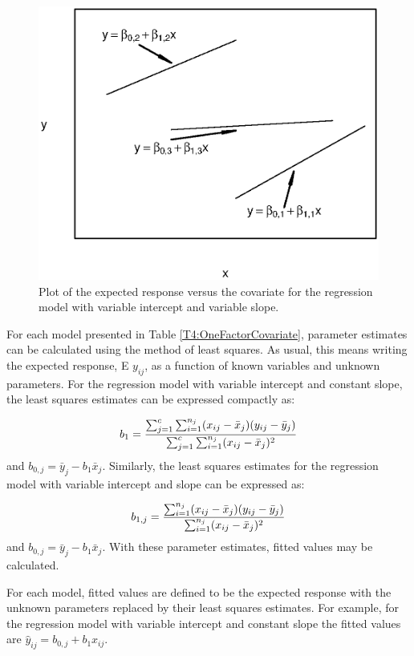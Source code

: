 \begin{figure}[htp]
  \begin{center}
    \includegraphics[width=.6\textwidth]{Chapter4/F4TheoryVarIntVarSlope.eps}
    \caption{\label{F4:TheoryVarIntVarSlope} \small  Plot of the expected response versus the covariate for the regression model
with variable intercept and variable slope.}
  \end{center}
\end{figure}

For each model presented in Table \ref{T4:OneFactorCovariate},
parameter estimates can be calculated using the method of least
squares. As usual, this means writing the expected response, E
$y_{ij}$, as a function of known variables and unknown parameters.
For the regression model with variable intercept and constant slope,
the least squares estimates can be expressed compactly as:

\begin{equation*}
b_1=\frac{\sum_{j=1}^{c}\sum_{i=1}^{n_j}(x_{ij}-\bar{x}_j)(y_{ij}-\bar{%
y}_j)}{\sum_{j=1}^{c}\sum_{i=1}^{n_j}(x_{ij}-\bar{x}_j)^2}
\end{equation*}
and $b_{0,j}=\bar{y}_j-b_1\bar{x}_j$. Similarly, the least
squares estimates for the regression model with variable intercept
and slope can be expressed as:

\begin{equation*}
b_{1,j}=\frac{\sum_{i=1}^{n_j}(x_{ij}-\bar{x}_j)(y_{ij}-\bar{y}_j)}{%
\sum_{i=1}^{n_j}(x_{ij}-\bar{x}_j)^2}
\end{equation*}
and $b_{0,j}=\bar{y}_j-b_1\bar{x}_j$. With these parameter
estimates, fitted values may be calculated.

For each model, fitted values are defined to be the expected response with
the unknown parameters replaced by their least squares estimates.
For example, for the regression model with variable intercept and
constant slope the fitted values are
$\hat{y}_{ij}=b_{0,j}+b_1x_{ij}$.

